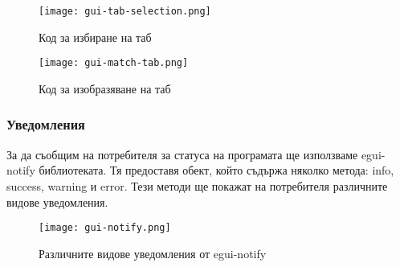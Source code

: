 \begin{figure}[!htb]
    \centering
    \texttt{[image: gui-tab-selection.png]}
    \caption{Код за избиране на таб}
    \label{fig:gui-tab-selection}
\end{figure}
\begin{figure}[!htb]
    \centering
    \texttt{[image: gui-match-tab.png]}
    \caption{Код за изобразяване на таб}
    \label{fig:gui-match-tab}
\end{figure}

\subsubsection{Уведомления}
За да съобщим на потребителя за статуса на програмата ще използваме egui-notify
библиотеката. Тя предоставя обект, който съдържа няколко метода: info, success, warning и error.
Тези методи ще покажат на потребителя различните видове уведомления.
\begin{figure}[!htb]
    \centering
    \texttt{[image: gui-notify.png]}
    \caption{Различните видове уведомления от egui-notify}
    \label{fig:gui-match-tab}
\end{figure}




